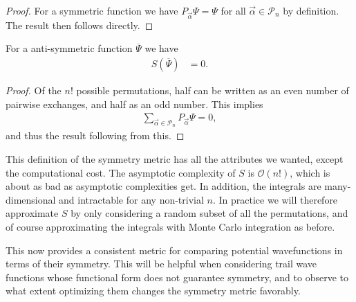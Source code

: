 \documentclass[Thesis.tex]{subfiles}
\begin{document}
\begin{proof}
    For a symmetric function we have $P_{\vec\alpha}\Psi=\Psi$ for all
    $\vec\alpha\in\mathcal{P}_n$ by definition. The result then follows directly.\end{proof}
\begin{corollary}
    For a anti-symmetric function $\overline\Psi$ we have
    \begin{align}
        S(\overline\Psi)&=0.
    \end{align}
\end{corollary}
\begin{proof}
   Of the $n!$ possible permutations, half can be written as an even number of
    pairwise exchanges, and half as an odd number. This implies
    \begin{align}
        \sum_{\vec\alpha\in \mathcal{P}_n} P_{\vec\alpha}\Psi = 0,
    \end{align}
    and thus the result following from this.
\end{proof}

This definition of the symmetry metric has all the attributes we wanted, except
the computational cost. The asymptotic complexity of $S$ is $\mathcal{O}(n!)$,
which is about as bad as asymptotic complexities get. In addition, the integrals
are many-dimensional and intractable for any non-trivial $n$. In practice we
will therefore approximate $S$ by only considering a random subset of all the
permutations, and of course approximating the integrals with Monte Carlo
integration as before.

This now provides a consistent metric for comparing potential wavefunctions in
terms of their symmetry. This will be helpful when considering trail
wave functions whose functional form does not guarantee symmetry, and to observe
to what extent optimizing them changes the symmetry metric favorably.
\end{document}
